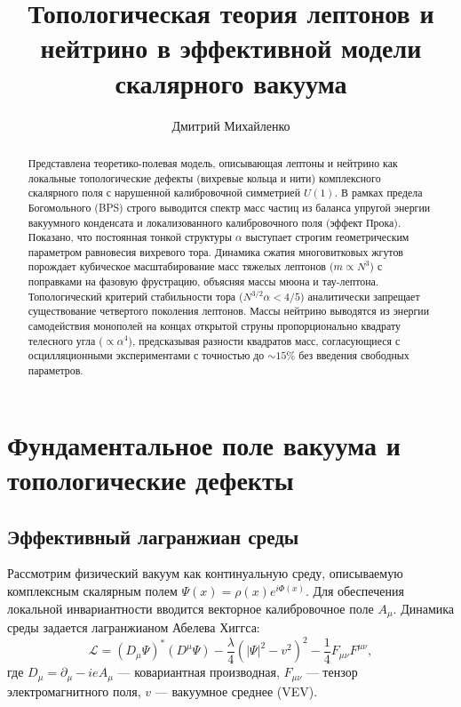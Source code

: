 \documentclass[12pt,a4paper]{article}
\title{Топологическая теория лептонов и нейтрино в эффективной модели скалярного вакуума}
\author{Дмитрий Михайленко}
\date{}
\begin{document}
\maketitle

\begin{abstract}
Представлена теоретико-полевая модель, описывающая лептоны и нейтрино как локальные топологические дефекты (вихревые кольца и нити) комплексного скалярного поля с нарушенной калибровочной симметрией $U(1)$. В рамках предела Богомольного (BPS) строго выводится спектр масс частиц из баланса упругой энергии вакуумного конденсата и локализованного калибровочного поля (эффект Прока). Показано, что постоянная тонкой структуры $\alpha$ выступает строгим геометрическим параметром равновесия вихревого тора. Динамика сжатия многовитковых жгутов порождает кубическое масштабирование масс тяжелых лептонов ($m \propto N^3$) с поправками на фазовую фрустрацию, объясняя массы мюона и тау-лептона. Топологический критерий стабильности тора ($N^{3/2} \alpha < 4/5$) аналитически запрещает существование четвертого поколения лептонов. Массы нейтрино выводятся из энергии самодействия монополей на концах открытой струны пропорционально квадрату телесного угла ($\propto \alpha^4$), предсказывая разности квадратов масс, согласующиеся с осцилляционными экспериментами с точностью до $\sim 15\%$ без введения свободных параметров.
\end{abstract}

\section{Фундаментальное поле вакуума и топологические дефекты}

\subsection{Эффективный лагранжиан среды}
Рассмотрим физический вакуум как континуальную среду, описываемую комплексным скалярным полем $\Psi(x) = \rho(x) e^{i\Phi(x)}$. Для обеспечения локальной инвариантности вводится векторное калибровочное поле $A_\mu$. Динамика среды задается лагранжианом Абелева Хиггса:
\begin{equation}
\mathcal{L} = (D_\mu \Psi)^* (D^\mu \Psi) - \frac{\lambda}{4} \left( |\Psi|^2 - v^2 \right)^2 - \frac{1}{4} F_{\mu\nu} F^{\mu\nu},
\label{eq:lagrangian_fundamental}
\end{equation}
где $D_\mu = \partial_\mu - i e A_\mu$ — ковариантная производная, $F_{\mu\nu}$ — тензор электромагнитного поля, $v$ — вакуумное среднее (VEV).
\end{document}
